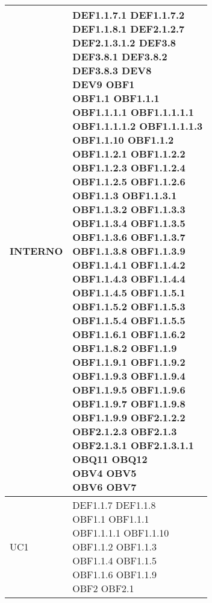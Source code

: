 \documentclass{scalatekids-article}
\begin{document}
\begin{longtable}[H]{|p{5.5cm}|p{5.5cm}|}
INTERNO & \multiLineCell[t]{DEF1.1.7.1 DEF1.1.7.2\\DEF1.1.8.1 DEF2.1.2.7\\DEF2.1.3.1.2 DEF3.8\\DEF3.8.1 DEF3.8.2\\DEF3.8.3 DEV8\\DEV9 OBF1\\OBF1.1 OBF1.1.1\\OBF1.1.1.1 OBF1.1.1.1.1\\OBF1.1.1.1.2 OBF1.1.1.1.3\\OBF1.1.10 OBF1.1.2\\OBF1.1.2.1 OBF1.1.2.2\\OBF1.1.2.3 OBF1.1.2.4\\OBF1.1.2.5 OBF1.1.2.6\\OBF1.1.3 OBF1.1.3.1\\OBF1.1.3.2 OBF1.1.3.3\\OBF1.1.3.4 OBF1.1.3.5\\OBF1.1.3.6 OBF1.1.3.7\\OBF1.1.3.8 OBF1.1.3.9\\OBF1.1.4.1 OBF1.1.4.2\\OBF1.1.4.3 OBF1.1.4.4\\OBF1.1.4.5 OBF1.1.5.1\\OBF1.1.5.2 OBF1.1.5.3\\OBF1.1.5.4 OBF1.1.5.5\\OBF1.1.6.1 OBF1.1.6.2\\OBF1.1.8.2 OBF1.1.9\\OBF1.1.9.1 OBF1.1.9.2\\OBF1.1.9.3 OBF1.1.9.4\\OBF1.1.9.5 OBF1.1.9.6\\OBF1.1.9.7 OBF1.1.9.8\\OBF1.1.9.9 OBF2.1.2.2\\OBF2.1.2.3 OBF2.1.3\\OBF2.1.3.1 OBF2.1.3.1.1\\OBQ11 OBQ12\\OBV4 OBV5\\OBV6 OBV7\\}\\
\hline
UC1 & \multiLineCell[t]{DEF1.1.7 DEF1.1.8\\OBF1.1 OBF1.1.1\\OBF1.1.1.1 OBF1.1.10\\OBF1.1.2 OBF1.1.3\\OBF1.1.4 OBF1.1.5\\OBF1.1.6 OBF1.1.9\\OBF2 OBF2.1\\}\\

\end{longtable}
\end{document}
